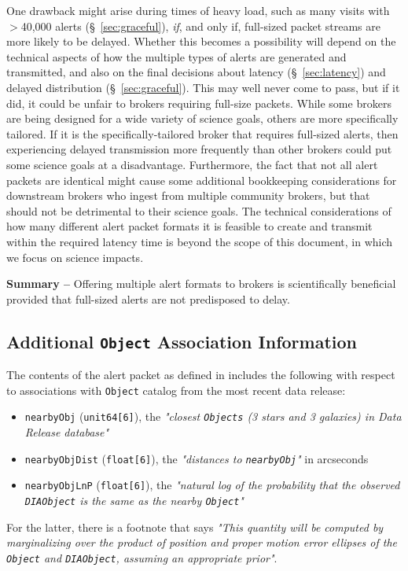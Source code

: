 \documentclass[DM,lsstdraft,authoryear,toc]{lsstdoc}
\begin{document}
One drawback might arise during times of heavy load, such as many visits with $>$40,000 alerts (\S~\ref{sec:graceful}), \emph{if}, and only if, full-sized packet streams are more likely to be delayed.
Whether this becomes a possibility will depend on the technical aspects of how the multiple types of alerts are generated and transmitted, and also on the final decisions about latency (\S~\ref{sec:latency}) and delayed distribution (\S~\ref{sec:graceful}).
This may well never come to pass, but if it did, it could be unfair to brokers requiring full-size packets.
While some brokers are being designed for a wide variety of science goals, others are more specifically tailored.
If it is the specifically-tailored broker that requires full-sized alerts, then experiencing delayed transmission more frequently than other brokers could put some science goals at a disadvantage. 
Furthermore, the fact that not all alert packets are identical might cause some additional bookkeeping considerations for downstream brokers who ingest from multiple community brokers, but that should not be detrimental to their science goals.
The technical considerations of how many different alert packet formats it is feasible to create and transmit within the required latency time is beyond the scope of this document, in which we focus on science impacts.

{\bf Summary --} Offering multiple alert formats to brokers is scientifically beneficial provided that full-sized alerts are not predisposed to delay.

\subsection{Additional {\tt Object} Association Information}\label{ssec:packets_add}

The contents of the alert packet as defined in  includes the following with respect to associations with {\tt Object} catalog from the most recent data release:
\begin{itemize}
\item {\tt nearbyObj} ({\tt unit64[6]}), the {\it "closest {\tt Objects} (3 stars and 3 galaxies) in Data Release database"}
\item {\tt nearbyObjDist} ({\tt float[6]}), the {\it "distances to {\tt nearbyObj}"} in arcseconds
\item {\tt nearbyObjLnP} ({\tt float[6]}), the {\it "natural log of the probability that the observed {\tt DIAObject} is the same as the nearby {\tt Object}"}
\end{itemize}
For the latter, there is a footnote that says {\it "This quantity will be computed by marginalizing over the product of position and proper motion error ellipses of the {\tt Object} and {\tt DIAObject}, assuming an appropriate prior"}.
\end{document}
